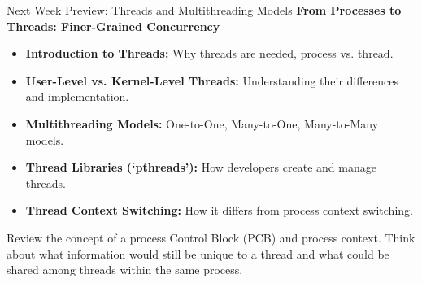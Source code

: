 \documentclass[aspectratio=169,11pt]{beamer}
\begin{document}
\begin{frame}{Next Week Preview: Threads and Multithreading Models}
  \small
  \textbf{From Processes to Threads: Finer-Grained Concurrency}
  \begin{itemize}
    \item \textbf{Introduction to Threads:} Why threads are needed, process vs. thread.
    \item \textbf{User-Level vs. Kernel-Level Threads:} Understanding their differences and implementation.
    \item \textbf{Multithreading Models:} One-to-One, Many-to-One, Many-to-Many models.
    \item \textbf{Thread Libraries (`pthreads'):} How developers create and manage threads.
    \item \textbf{Thread Context Switching:} How it differs from process context switching.
  \end{itemize}
  \vspace{0.3cm}
  \pause
  \begin{tcolorbox}[title=\textbf{Prep Tip for Next Session}, colback=green!5!white, colframe=green!75!black, fonttitle=\bfseries]
  Review the concept of a process Control Block (PCB) and process context. Think about what information would still be unique to a thread and what could be shared among threads within the same process.
  \end{tcolorbox}
\end{frame}


\appendix
\end{document}
